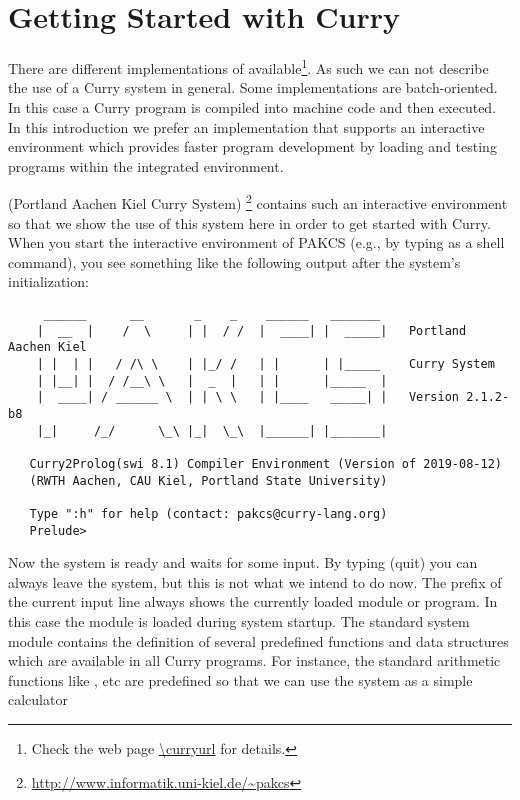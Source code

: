 \chapter{Getting Started with Curry}

There are different implementations of \curry{}
available\footnote{Check the web page \url{\curryurl} for details.}.
As such we can not describe the use of a Curry system
in general. Some implementations are batch-oriented.  In this case a 
Curry program is compiled into machine code and then executed. 
In this introduction we prefer an implementation that supports an interactive environment which provides faster program development by loading and testing programs within the integrated environment.

\pakcs{} (Portland Aachen Kiel Curry System)
\cite{Hanus19PAKCS}\footnote{\url{http://www.informatik.uni-kiel.de/~pakcs}}
contains such an interactive environment so that we show the use
of this system here in order to get started with Curry.
When you start the interactive environment of PAKCS
(e.g., by typing 
as a shell command),
you see something like the following output after the system's
initialization:
\begin{verbatim}
     ______      __       _    _    ______   _______     
    |  __  |    /  \     | |  / /  |  ____| |  _____|   Portland Aachen Kiel
    | |  | |   / /\ \    | |_/ /   | |      | |_____    Curry System
    | |__| |  / /__\ \   |  _  |   | |      |_____  |   
    |  ____| / ______ \  | | \ \   | |____   _____| |   Version 2.1.2-b8
    |_|     /_/      \_\ |_|  \_\  |______| |_______|   
   
   Curry2Prolog(swi 8.1) Compiler Environment (Version of 2019-08-12)
   (RWTH Aachen, CAU Kiel, Portland State University)
   
   Type ":h" for help (contact: pakcs@curry-lang.org)
   Prelude> 
\end{verbatim}
Now the system is ready and waits for some input.
By typing  (quit) you can always leave the system,
but this is not what we intend to do now.
The prefix of the current input line always shows the currently
loaded module or program. In this case the module
is loaded during system startup.
The standard system module  contains
the definition of several predefined functions and data structures
which are available in all Curry programs.
For instance, the standard arithmetic functions like \code{+}, \code{*} etc
are predefined so that we can use the system as a simple calculator
